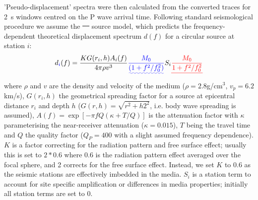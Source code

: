\documentclass[reviewcopy]{elsart}
\providecommand{\DIFadd}[1]{{\protect\color{blue}\uwave{#1}}} %
\providecommand{\DIFdel}[1]{{\protect\color{red}\sout{#1}}}                      %
\providecommand{\DIFaddbegin}{} %
\providecommand{\DIFaddend}{} %
\providecommand{\DIFdelbegin}{} %
\providecommand{\DIFdelend}{} %
\begin{document}
'Pseudo-displacement' spectra were then calculated from the converted traces for 2~s windows
centred on the P wave arrival time.  Following standard seismological
procedure we assume the \DIFdelbegin \DIFdel{\mbox{%
\citep{brune70}
}%
}\DIFdelend \DIFaddbegin \DIFadd{\mbox{%
\citet{brune70}
}%
}\DIFaddend source model, which predicts
the frequency-dependent theoretical displacement spectrum $d(f)$ for a circular source at
station $i$:
\begin{equation}
d\DIFaddbegin \DIFadd{_i}\DIFaddend (f)=\frac{K G(r_i,h) A_i(f)}{4 \pi \rho v^3} \DIFaddbegin \DIFadd{\frac{M_0}{(1+f^2/f_0^2)}  }\DIFaddend S_i
\DIFdelbegin \DIFdel{\frac{M_0}{1+f^2/f_0^2} 
}\DIFdelend \end{equation}
where $\rho$ and $v$ are the density and velocity of the medium
($\rho=2.8$g/cm$^3$, $v_p=6.2$km/s), $G(r_i,h)$ the geometrical 
spreading factor for a source at epicentral distance $r_i$ and depth
$h$ (\DIFdelbegin \DIFdel{$G(r,h)=\sqrt{r^2+h2^2}$}\DIFdelend \DIFaddbegin \DIFadd{$G(r_i,h)=\sqrt{r_i^2+h^2}$}\DIFaddend , i.e. body wave spreading is assumed),
\DIFdelbegin \DIFdel{$A(f)=\exp[-\pi f Q (\kappa + T / Q)]$ }\DIFdelend \DIFaddbegin \DIFadd{$A(f)=\exp[-\pi f Q (\kappa + T_i / Q)]$ }\DIFaddend is the attenuation factor with 
$\kappa$ parameterising the near-receiver attenuation ($\kappa=0.015$),
\DIFdelbegin \DIFdel{$T$ }\DIFdelend \DIFaddbegin \DIFadd{$T_i$ }\DIFaddend being the travel time and $Q$ the quality factor ($Q_P=400$ with a
slight assumed frequency dependence). $K$ is a factor correcting for the
radiation pattern and free surface effect; usually this is set to
$2*0.6$ where 0.6 is the radiation pattern effect averaged over the
focal sphere, and 2 corrects for the free surface effect.  Instead, we
set $K$ to 0.6 as the seismic stations are effectively imbedded in the
media.  $S_i$ is a station term to account for site specific
amplification or differences in media properties; initially all
station terms are set to 0. 
\end{document}
